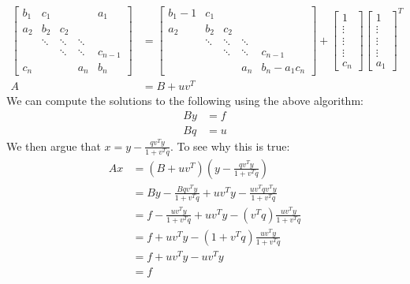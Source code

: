 \documentclass{article}
\begin{document}
\begin{align*}
    \begin{bmatrix}
        b_1 & c_1 & & & a_1 \\
        a_2 & b_2 & c_2 & & \\
        & \ddots & \ddots & \ddots & \\
        & & \ddots & \ddots & c_{n-1} \\
        c_n & & & a_n & b_n
    \end{bmatrix}
    & = \begin{bmatrix}
        b_1 - 1 & c_1 & & & \\
        a_2 & b_2 & c_2 & & \\
        & \ddots & \ddots & \ddots & \\
        & & \ddots & \ddots & c_{n-1} \\
        & & & a_n & b_n - a_1c_n
    \end{bmatrix} + 
    \begin{bmatrix}
        1 \\ \vdots \\ \vdots \\ \vdots \\ c_n
    \end{bmatrix}
    \begin{bmatrix}
        1 \\ \vdots \\ \vdots \\ \vdots \\ a_1
    \end{bmatrix}^T \\
    A & = B + uv^T
\end{align*}
We can compute the solutions to the following using the above algorithm:
\begin{align*}
    By & = f \\
    Bq & = u
\end{align*}
We then argue that $x = y - \frac{qv^Ty}{1 + v^Tq}$. To see why this is true:
\begin{align*}
    Ax & = (B + uv^T)\left(y - \frac{qv^Ty}{1 + v^Tq}\right) \\
    & = By - \frac{Bqv^Ty}{1 + v^Tq} + uv^T y - \frac{uv^Tqv^Ty}{1 + v^Tq} \\
    & = f - \frac{uv^Ty}{1 + v^Tq} + uv^T y - (v^Tq)\frac{uv^Ty}{1 + v^Tq} \\
    & = f + uv^T y - (1 + v^Tq)\frac{uv^Ty}{1 + v^Tq} \\
    & = f + uv^T y - uv^Ty \\
    & = f
\end{align*}
\end{document}
